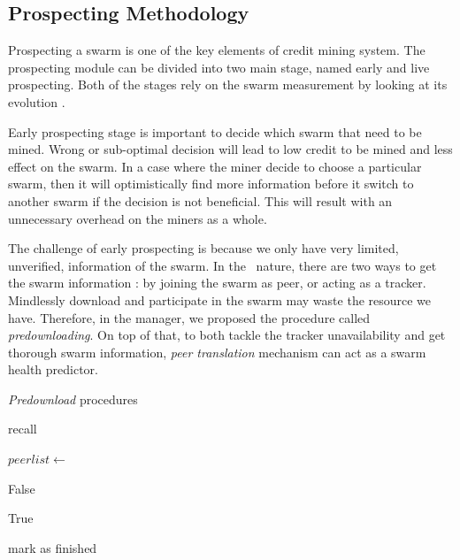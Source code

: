 \subsection{Prospecting Methodology}
Prospecting a swarm is one of the key elements of credit mining system. The prospecting module can be divided into two main stage, named early and live prospecting. Both of the stages rely on the swarm measurement by looking at its evolution \cite{2013:swarmevolution:su}. 

Early prospecting stage is important to decide which swarm that need to be mined. Wrong or sub-optimal decision will lead to low credit to be mined and less effect on the swarm. In a case where the miner decide to choose a particular swarm, then it will optimistically find more information before it switch to another swarm if the decision is not beneficial. This will result with an unnecessary overhead on the miners as a whole.  

The challenge of early prospecting is because we only have very limited, unverified, information of the swarm. In the \bt~nature, there are two ways to get the swarm information : by joining the swarm as peer, or acting as a tracker. Mindlessly download and participate in the swarm may waste the resource we have. Therefore, in the manager, we proposed the procedure called \textit{predownloading}. On top of that, to both tackle the tracker unavailability and get thorough swarm information, \textit{peer translation} mechanism can act as a swarm health predictor.

\begin{algorithm}[h]
	\caption{\textit{Predownload} procedures}
	\label{alg:predown}
	\begin{algorithmic}[1]
		\State recall 
		\EndIf
		
		\State {}
		
		\State {}
		\State {}
		
		\State {}
		\EndFunction
		\Statex
		\State $peerlist \gets$ 
		\State {}
		
		\State {}
		\State \Return False
		\EndIf
		
		\State {}
		\State {}
		\State \Return True
		\EndIf
		
		\State mark as finished
		\EndIf
		\State {}
		\EndFunction		
	\end{algorithmic}
\end{algorithm}

